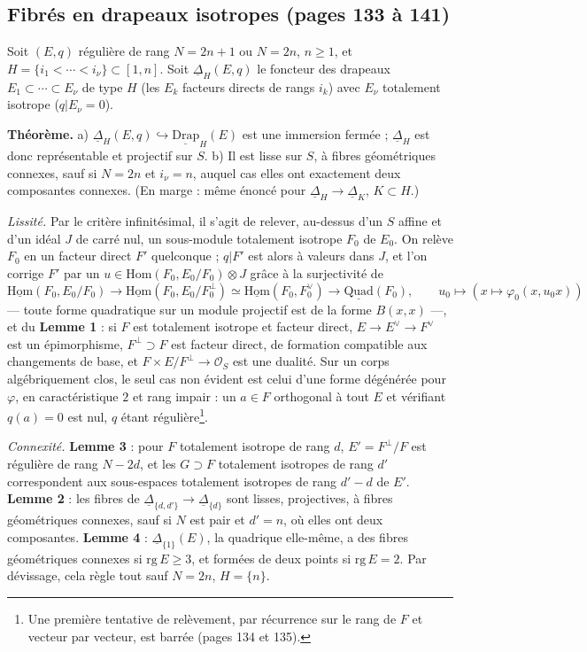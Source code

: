 \documentclass[11pt,a4paper]{article}
\begin{document}
\subsection*{Fibrés en drapeaux isotropes (pages 133 à 141)}

Soit $(E, q)$ régulière de rang $N = 2n + 1$ ou $N = 2n$, $n \geq 1$, et $H = \{i_1 <
\cdots < i_\nu\} \subset [1, n]$. Soit $\underline{\Delta}_H(E, q)$ le foncteur des
drapeaux $E_1 \subset \cdots \subset E_\nu$ de type $H$ (les $E_k$ facteurs directs de
rangs $i_k$) avec $E_\nu$ totalement isotrope ($q|E_\nu = 0$).

\textbf{Théorème.} a) $\underline{\Delta}_H(E, q) \hookrightarrow
\underline{\mathrm{Drap}}_H(E)$ est une immersion fermée ; $\underline{\Delta}_H$ est donc
représentable et projectif sur $S$. b) Il est lisse sur $S$, à fibres géométriques
connexes, sauf si $N = 2n$ et $i_\nu = n$, auquel cas elles ont exactement deux
composantes connexes. (En marge : même énoncé pour $\underline{\Delta}_H \to
\underline{\Delta}_K$, $K \subset H$.)

\emph{Lissité.} Par le critère infinitésimal, il s'agit de relever, au-dessus d'un
$S$ affine et d'un idéal $J$ de carré nul, un sous-module totalement isotrope $F_0$ de
$E_0$. On relève $F_0$ en un facteur direct $F'$ quelconque ; $q|F'$ est alors à
valeurs dans $J$, et l'on corrige $F'$ par un $u \in \mathrm{Hom}(F_0, E_0/F_0) \otimes
J$ grâce à la surjectivité de
\[
  \underline{\mathrm{Hom}}(F_0, E_0/F_0) \to \underline{\mathrm{Hom}}(F_0,
  E_0/F_0^{\perp}) \simeq \underline{\mathrm{Hom}}(F_0, F_0^{\vee}) \to
  \underline{\mathrm{Quad}}(F_0), \qquad u_0 \mapsto (x \mapsto \varphi_0(x, u_0x))
\]
— toute forme quadratique sur un module projectif est de la forme $B(x, x)$ —, et du
\textbf{Lemme 1} : si $F$ est totalement isotrope et facteur direct, $E \to E^{\vee}
\to F^{\vee}$ est un épimorphisme, $F^{\perp} \supset F$ est facteur direct, de formation
compatible aux changements de base, et $F \times E/F^{\perp} \to \mathcal{O}_S$ est une
dualité. Sur un corps algébriquement clos, le seul cas non évident est celui d'une
forme dégénérée pour $\varphi$, en caractéristique $2$ et rang impair : un $a \in F$
orthogonal à tout $E$ et vérifiant $q(a) = 0$ est nul, $q$ étant régulière\footnote{Une
première tentative de relèvement, par récurrence sur le rang de $F$ et vecteur par
vecteur, est barrée (pages 134 et 135).}.

\emph{Connexité.} \textbf{Lemme 3} : pour $F$ totalement isotrope de rang $d$, $E' =
F^{\perp}/F$ est régulière de rang $N - 2d$, et les $G \supset F$ totalement isotropes
de rang $d'$ correspondent aux sous-espaces totalement isotropes de rang $d' - d$ de
$E'$. \textbf{Lemme 2} : les fibres de $\underline{\Delta}_{\{d, d'\}} \to
\underline{\Delta}_{\{d\}}$ sont lisses, projectives, à fibres géométriques connexes, sauf
si $N$ est pair et $d' = n$, où elles ont deux composantes. \textbf{Lemme 4} :
$\underline{\Delta}_{\{1\}}(E)$, la quadrique elle-même, a des fibres géométriques
connexes si $\mathrm{rg}\,E \geq 3$, et formées de deux points si $\mathrm{rg}\,E = 2$.
Par dévissage, cela règle tout sauf $N = 2n$, $H = \{n\}$.
\end{document}
